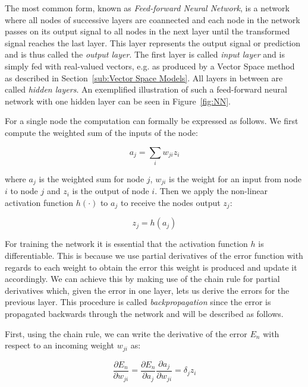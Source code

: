 The most common form, known as \emph{Feed-forward Neural Network}, is a network where all nodes of successive layers are coannected and each node in the network passes on its output signal to all nodes in the next layer until the transformed signal reaches the last layer. This layer represents the output signal or prediction and is thus called the \emph{output layer}. The first layer is called \emph{input layer} and is simply fed with real-valued vectors, e.g. as produced by a Vector Space method as described in Section~\ref{sub:Vector Space Models}. All layers in between are called \emph{hidden layers}. An exemplified illustration of such a feed-forward neural network with one hidden layer can be seen in Figure~\ref{fig:NN}.

For a single node the computation can formally be expressed as follows. We first compute the weighted sum of the inputs of the node:

\begin{equation}
  a_j = \sum_i w_{ji} z_i
  \label{eq:ann weighted sum}
\end{equation}

where $a_j$ is the weighted sum for node $j$, $w_{ji}$ is the weight for an input from node $i$ to node $j$ and $z_i$ is the output of node $i$. Then we apply the non-linear activation function $h(\cdot)$ to $a_j$ to receive the nodes output $z_j$:

\begin{equation}
  z_j = h(a_j)
  \label{eq:ann activation}
\end{equation}

For training the network it is essential that the activation function $h$ is differentiable. This is because we use partial derivatives of the error function with regards to each weight to obtain the error this weight is produced and update it accordingly. We can achieve this by making use of the chain rule for partial derivatives which, given the error in one layer, lets us derive the errors for the previous layer. This procedure is called \emph{backpropagation} since the error is propagated backwards through the network and will be described as follows.

First, using the chain rule, we can write the derivative of the error $E_n$ with respect to an incoming weight $w_{ji}$ as:

\begin{equation}
	\frac{\partial E_n}{\partial w_{ji}} = \frac{\partial E_n}{\partial a_j} \frac{\partial a_j}{\partial w_{ji}} = \delta_j z_i
	\label{eq:ann derivatives}
\end{equation}

